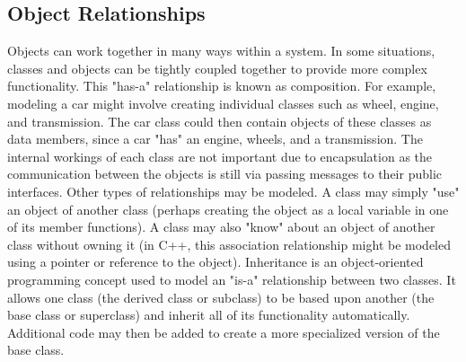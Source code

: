 \documentclass{report}
\begin{document}
    \subsection{Object Relationships}
    \bigbreak \noindent 
    Objects can work together in many ways within a system. In some situations, classes and objects can be tightly coupled together to provide more complex functionality. This "has-a" relationship is known as composition. For example, modeling a car might involve creating individual classes such as wheel, engine, and transmission. The car class could then contain objects of these classes as data members, since a car "has" an engine, wheels, and a transmission. The internal workings of each class are not important due to encapsulation as the communication between the objects is still via passing messages to their public interfaces.
    \bigbreak \noindent 
    Other types of relationships may be modeled. A class may simply "use" an object of another class (perhaps creating the object as a local variable in one of its member functions). A class may also "know" about an object of another class without owning it (in C++, this association relationship might be modeled using a pointer or reference to the object).
    \bigbreak \noindent 
    Inheritance is an object-oriented programming concept used to model an "is-a" relationship between two classes. It allows one class (the derived class or subclass) to be based upon another (the base class or superclass) and inherit all of its functionality automatically. Additional code may then be added to create a more specialized version of the base class.

    \bigbreak \noindent 
\end{document}
